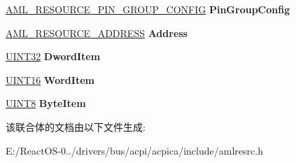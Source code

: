 \begin{DoxyCompactItemize}
\item 
\mbox{\label{unionaml__resource_a9c953d50f32322e303b3bc9995c75761}} 
\hyperlink{structaml__resource__pin__group__config}{A\+M\+L\+\_\+\+R\+E\+S\+O\+U\+R\+C\+E\+\_\+\+P\+I\+N\+\_\+\+G\+R\+O\+U\+P\+\_\+\+C\+O\+N\+F\+IG} {\bfseries Pin\+Group\+Config}
\item 
\mbox{\label{unionaml__resource_ae71c7363d6365a2f72d81bea74c59b66}} 
\hyperlink{structaml__resource__address}{A\+M\+L\+\_\+\+R\+E\+S\+O\+U\+R\+C\+E\+\_\+\+A\+D\+D\+R\+E\+SS} {\bfseries Address}
\item 
\mbox{\label{unionaml__resource_a098fc021452f878c5d748c3669c7d64b}} 
\hyperlink{_processor_bind_8h_ae1e6edbbc26d6fbc71a90190d0266018}{U\+I\+N\+T32} {\bfseries Dword\+Item}
\item 
\mbox{\label{unionaml__resource_a0e0ef6bf862a1fb9d7fb56b707642c0a}} 
\hyperlink{_processor_bind_8h_a09f1a1fb2293e33483cc8d44aefb1eb1}{U\+I\+N\+T16} {\bfseries Word\+Item}
\item 
\mbox{\label{unionaml__resource_aff0446b61014cf919fe03003683bb308}} 
\hyperlink{_processor_bind_8h_ab27e9918b538ce9d8ca692479b375b6a}{U\+I\+N\+T8} {\bfseries Byte\+Item}
\end{DoxyCompactItemize}


该联合体的文档由以下文件生成\+:\begin{DoxyCompactItemize}
\item 
E\+:/\+React\+O\+S-\/0../drivers/bus/acpi/acpica/include/amlresrc.\+h\end{DoxyCompactItemize}
